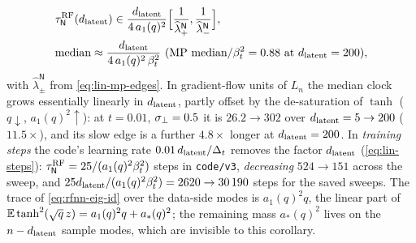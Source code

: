 \begin{corollary}
\begin{enumerate}
\begin{equation}
\begin{aligned}
&\tau_{\mathsf N}^{\rm RF}(d_{\mathrm{latent}})\in\frac{d_{\mathrm{latent}}}{4\,a_1(q)^2}\Big[\frac1{\widehat\lambda^{\mathsf N}_+},\frac1{\widehat\lambda^{\mathsf N}_-}\Big],\\ & \text{median}\approx\frac{d_{\mathrm{latent}}}{4\,a_1(q)^2\,\beta_t^2}\ (\text{MP median}/\beta_t^2=0.88\text{ at }d_{\mathrm{latent}}=200),
\end{aligned}
\end{equation}
with $\widehat\lambda^{\mathsf N}_\pm$ from \eqref{eq:lin-mp-edges}. In gradient-flow units of $L_n$ the median clock grows essentially linearly in $d_{\mathrm{latent}}$, partly offset by the de-saturation of $\tanh$ ($q\downarrow$, $a_1(q)^2\uparrow$): at $t=0.01$, $\sigma_{\perp}=0.5$ it is $26.2\to302$ over $d_{\mathrm{latent}}=5\to200$ ($11.5\times$), and its slow edge is a further $4.8\times$ longer at $d_{\mathrm{latent}}=200$. In \emph{training steps} the code's learning rate $0.01\,d_{\mathrm{latent}}/\Delta_t$ removes the factor $d_{\mathrm{latent}}$ (\eqref{eq:lin-steps}): $\tau^{\rm RF}_{\mathsf N}=25/(a_1(q)^2\beta_t^2)$ steps in \texttt{code/v3}, \emph{decreasing} $524\to151$ across the sweep, and $25d_{\mathrm{latent}}/(a_1(q)^2\beta_t^2)=2620\to30\,190$ steps for the saved sweeps. The trace of \eqref{eq:rfnn-eig-id} over the data-side modes is $a_1(q)^2q$, the linear part of $\mathbb{E}\tanh^2(\sqrt q\,z)=a_1(q)^2q+a_*(q)^2$; the remaining mass $a_*(q)^2$ lives on the $n-d_{\mathrm{latent}}$ sample modes, which are invisible to this corollary.
\end{enumerate}
\end{corollary}
